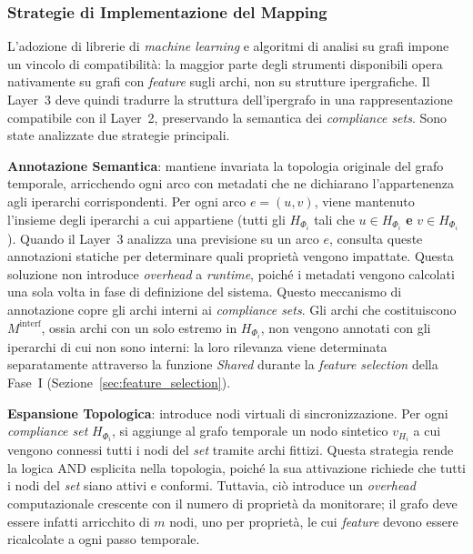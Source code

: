 \subsubsection{Strategie di Implementazione del Mapping}
\label{sec:strategie_mapping}

L'adozione di librerie di \textit{machine learning} e algoritmi di analisi su grafi impone un
vincolo di compatibilità: la maggior parte degli strumenti disponibili opera nativamente su grafi
con \textit{feature} sugli archi, non su strutture ipergrafiche. Il Layer~3 deve quindi tradurre
la struttura dell'ipergrafo in una rappresentazione compatibile con il Layer~2, preservando la
semantica dei \textit{compliance sets}. Sono state analizzate due strategie principali.

\textbf{Annotazione Semantica}: mantiene invariata la topologia originale del grafo temporale,
arricchendo ogni arco con metadati che ne dichiarano l'appartenenza agli iperarchi corrispondenti.
Per ogni arco $e = (u,v)$, viene mantenuto l'insieme degli iperarchi a cui appartiene (tutti gli
$H_{\Phi_i}$ tali che $u \in H_{\Phi_i}$ \textbf{e} $v \in H_{\Phi_i}$). Quando il Layer~3
analizza una previsione su un arco $e$, consulta queste annotazioni statiche per determinare quali
proprietà vengono impattate. Questa soluzione non introduce \textit{overhead} a \textit{runtime},
poiché i metadati vengono calcolati una sola volta in fase di definizione del sistema. Questo
meccanismo di annotazione copre gli archi interni ai \textit{compliance sets}. Gli archi che
costituiscono $M^{\text{interf}}$, ossia archi con un solo estremo in $H_{\Phi_i}$, non vengono
annotati con gli iperarchi di cui non sono interni: la loro rilevanza viene determinata
separatamente attraverso la funzione \textit{Shared} durante la \textit{feature selection} della
Fase~I (Sezione~\ref{sec:feature_selection}).

\textbf{Espansione Topologica}: introduce nodi virtuali di sincronizzazione. Per ogni
\textit{compliance set} $H_{\Phi_i}$, si aggiunge al grafo temporale un nodo sintetico $v_{H_i}$
a cui vengono connessi tutti i nodi del \textit{set} tramite archi fittizi. Questa strategia rende
la logica AND esplicita nella topologia, poiché la sua attivazione richiede che tutti i nodi del
\textit{set} siano attivi e conformi. Tuttavia, ciò introduce un \textit{overhead} computazionale
crescente con il numero di proprietà da monitorare; il grafo deve essere infatti arricchito di $m$
nodi, uno per proprietà, le cui \textit{feature} devono essere ricalcolate a ogni passo temporale.

